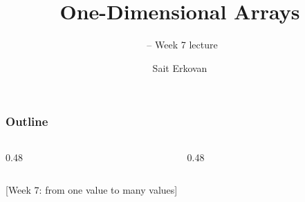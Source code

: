 \documentclass[aspectratio=169,10pt,compress]{beamer}
\title[Arrays 1D: Lecture]{
	One-Dimensional Arrays
}
\subtitle{
	\cisOOO\ -- Week 7 lecture
}
\author[Erkovan]{Sait Erkovan}
\institute[FCIS]{
	Faculty of Computer and Information Sciences\\
	Yeditepe University
}
\date{{\tiny \hbTimeStamp}}
\begin{document}
\begin{frame}[t,fragile]
	\titlepage
\end{frame}




\begin{frame}[t,fragile] \frametitle{Outline}
	\begin{columns}[T]
		\begin{column}{0.48\textwidth}
			\tableofcontents[sections={1-3}, hideallsubsections]
		\end{column}
		\begin{column}{0.48\textwidth}
			\tableofcontents[sections={4-6}, hideallsubsections]
		\end{column}
	\end{columns}
\end{frame}




[\small Week 7: from one value to many values]
\end{document}
